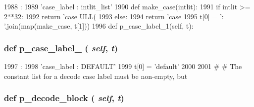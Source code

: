 \begin{DoxyCode}
1988                                :
1989         'case_label : intlit_list'
1990         def make_case(intlit):
1991             if intlit >= 2**32:
1992                 return 'case ULL(%
1993             else:
1994                 return 'case %
1995         t[0] = ': '.join(map(make_case, t[1]))
1996 
    def p_case_label_1(self, t):
\end{DoxyCode}
\hypertarget{classisa__parser_1_1ISAParser_a8cdd774d2dbf5d6d58b463d80c3dab3a}{
\subsubsection[{p\_\-case\_\-label\_\-1}]{\setlength{\rightskip}{0pt plus 5cm}def p\_\-case\_\-label\_ ( {\em self}, \/   {\em t})}}
\label{classisa__parser_1_1ISAParser_a8cdd774d2dbf5d6d58b463d80c3dab3a}



\begin{DoxyCode}
1997                                :
1998         'case_label : DEFAULT'
1999         t[0] = 'default'
2000 
2001     #
    # The constant list for a decode case label must be non-empty, but
\end{DoxyCode}
\hypertarget{classisa__parser_1_1ISAParser_a6c5a58df0a6f0b0978e6afb22a37444c}{
\subsubsection[{p\_\-decode\_\-block}]{\setlength{\rightskip}{0pt plus 5cm}def p\_\-decode\_\-block ( {\em self}, \/   {\em t})}}
\label{classisa__parser_1_1ISAParser_a6c5a58df0a6f0b0978e6afb22a37444c}



